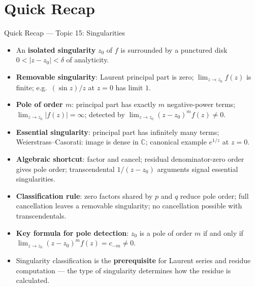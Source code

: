 \documentclass[12pt,a4paper]{article}
\begin{document}
\section{Quick Recap}

\begin{learnbox}{Quick Recap --- Topic 15: Singularities}
\begin{itemize}[leftmargin=1.5em]
  \item An \textbf{isolated singularity} $z_0$ of $f$ is surrounded by a punctured disk
    $0 < |z-z_0| < \delta$ of analyticity.
  \item \textbf{Removable singularity}: Laurent principal part is zero; $\lim_{z\to z_0}f(z)$
    is finite; e.g.\ $(\sin z)/z$ at $z=0$ has limit $1$.
  \item \textbf{Pole of order $m$}: principal part has exactly $m$ negative-power terms;
    $\lim_{z\to z_0}|f(z)|=\infty$; detected by $\lim_{z\to z_0}(z-z_0)^m f(z) \neq 0$.
  \item \textbf{Essential singularity}: principal part has infinitely many terms; Weierstrass--Casorati:
    image is dense in $\mathbb{C}$; canonical example $e^{1/z}$ at $z=0$.
  \item \textbf{Algebraic shortcut}: factor and cancel; residual denominator-zero order gives pole
    order; transcendental $1/(z-z_0)$ arguments signal essential singularities.
  \item \textbf{Classification rule}: zero factors shared by $p$ and $q$ reduce pole order; full
    cancellation leaves a removable singularity; no cancellation possible with transcendentals.
  \item \textbf{Key formula for pole detection}:
    $z_0$ is a pole of order $m$ if and only if $\lim_{z\to z_0}(z-z_0)^m f(z) = c_{-m} \neq 0$.
  \item Singularity classification is the \textbf{prerequisite} for Laurent series and residue
    computation --- the type of singularity determines how the residue is calculated.
\end{itemize}
\end{learnbox}
\end{document}
